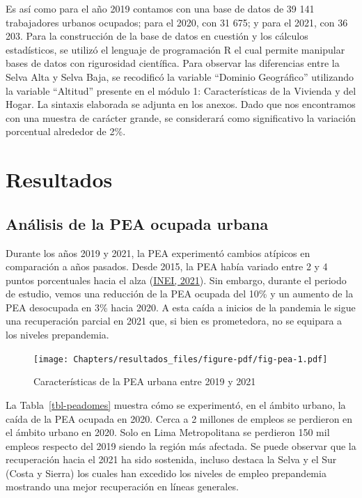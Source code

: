 \documentclass[
  letterpaper,
  12pt,
  oneside,
  spanish,
  doublespacing,
  headsepline,
  parskip]{MastersDoctoralThesis}
\begin{document}
Es así como para el año 2019 contamos con una base de datos de 39 141
trabajadores urbanos ocupados; para el 2020, con 31 675; y para el 2021,
con 36 203. Para la construcción de la base de datos en cuestión y los
cálculos estadísticos, se utilizó el lenguaje de programación R el cual
permite manipular bases de datos con rigurosidad científica. Para
observar las diferencias entre la Selva Alta y Selva Baja, se recodificó
la variable ``Dominio Geográfico'' utilizando la variable ``Altitud''
presente en el módulo 1: Características de la Vivienda y del Hogar. La
sintaxis elaborada se adjunta en los anexos. Dado que nos encontramos
con una muestra de carácter grande, se considerará como significativo la
variación porcentual alrededor de 2\%.


\hypertarget{sec-resultados}{%
\chapter{Resultados}\label{sec-resultados}}

\hypertarget{anuxe1lisis-de-la-pea-ocupada-urbana}{%
\section{Análisis de la PEA ocupada
urbana}\label{anuxe1lisis-de-la-pea-ocupada-urbana}}

Durante los años 2019 y 2021, la PEA experimentó cambios atípicos en
comparación a años pasados. Desde 2015, la PEA había variado entre 2 y 4
puntos porcentuales hacia el alza
(\protect\hyperlink{ref-inei2021}{INEI, 2021}). Sin embargo, durante el
periodo de estudio, vemos una reducción de la PEA ocupada del 10\% y un
aumento de la PEA desocupada en 3\% hacia 2020. A esta caída a inicios
de la pandemia le sigue una recuperación parcial en 2021 que, si bien es
prometedora, no se equipara a los niveles prepandemia.

\begin{figure}

\caption{\label{fig-pea}Características de la PEA urbana entre 2019 y
2021}

{\centering \texttt{[image: Chapters/resultados\_files/figure-pdf/fig-pea-1.pdf]}

}

\end{figure}

La Tabla~\ref{tbl-peadomes} muestra cómo se experimentó, en el ámbito
urbano, la caída de la PEA ocupada en 2020. Cerca a 2 millones de
empleos se perdieron en el ámbito urbano en 2020. Solo en Lima
Metropolitana se perdieron 150 mil empleos respecto del 2019 siendo la
región más afectada. Se puede observar que la recuperación hacia el 2021
ha sido sostenida, incluso destaca la Selva y el Sur (Costa y Sierra)
los cuales han excedido los niveles de empleo prepandemia mostrando una
mejor recuperación en líneas generales.
\end{document}
